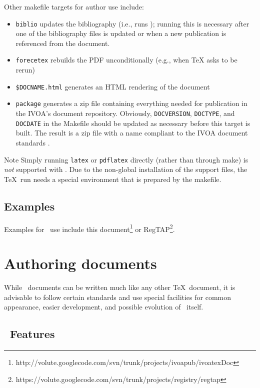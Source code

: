 \documentclass[11pt,a4paper]{ivoa}
\begin{document}
Other makefile targets for author use include:

\begin{itemize}
\item \texttt{biblio} updates the bibliography (i.e., runs \BibTeX);
running this is necessary after one of the bibliography files is updated
or when a new publication is referenced from the document.
\item \texttt{forecetex} rebuilds the PDF unconditionally (e.g., when TeX
asks to be rerun)
\item \texttt{\$DOCNAME.html} generates an HTML rendering of the document
\item \texttt{package} generates a zip file containing everything needed
for publication in the IVOA's document repository.   Obviously, 
\texttt{DOCVERSION}, \texttt{DOCTYPE}, and \texttt{DOCDATE} in the
Makefile should be updated as necessary before this target is built.
The result is a zip file with a name compliant to the IVOA document
standards \citep{std:docSTD}.
\end{itemize}

\begin{admonition}{Note}
Simply running \texttt{latex} or \texttt{pdflatex} directly
(rather than through make) is \emph{not} supported with \ivoatex.  Due
to the non-global installation of the support files, the \TeX\ run needs
a special environment that is prepared by the makefile.
\end{admonition}

\subsection{Examples}

Examples for \ivoatex\ use include this 
document\footnote{http://volute.googlecode.com/svn/trunk/projects/ivoapub/ivoatexDoc}
or
RegTAP\footnote{https://volute.googlecode.com/svn/trunk/projects/registry/regtap}.

\section{Authoring documents}
\label{sect:authoring}

While \ivoatex\ documents can be written much like any other \TeX\
document, it is advisable to follow certain standards and use special
facilities for common appearance, easier development, and possible
evolution of \ivoatex\ itself.

\subsection{\ivoatex\ Features}
\end{document}
